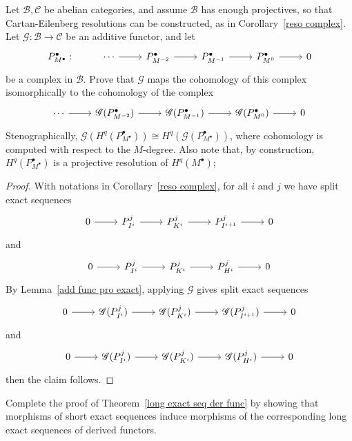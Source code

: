 \begin{exercise}\label{two fuc reso}
Let $\mathcal{B},\mathcal{C}$ be abelian categories, and assume $\mathcal{B}$ has enough projectives, so that Cartan-Eilenberg resolutions can be constructed, as in 
Corollary~\ref{reso complex}. Let $\mathscr{G}:\mathcal{B}\to\mathcal{C}$ be an additive functor, and let 
\[
\begin{tikzcd}
P^\bullet_{M^\bullet}:&\cdots\ar[r]&P^\bullet_{M^{-2}}\ar[r]&P^\bullet_{M^{-1}}\ar[r]&P^\bullet_{M^{0}}\ar[r]&0
\end{tikzcd}
\] be a complex in $\mathcal{B}$. Prove that $\mathscr{G}$ maps the cohomology of this complex isomorphically to the cohomology of the complex
\[\begin{tikzcd}
\cdots\ar[r]&\mathscr{G}(P^\bullet_{M^{-2}})\ar[r]&\mathscr{G}(P^\bullet_{M^{-1}})\ar[r]&\mathscr{G}(P^\bullet_{M^{0}})\ar[r]&0
\end{tikzcd}\]
Stenographically, $\mathscr{G}(H^q(P^\bullet_{M^\bullet}))\cong H^q(\mathscr{G}(P^\bullet_{M^\bullet}))$, where cohomology is computed
with respect to the $M$-degree. Also note that, by construction, $H^q(P^\bullet_{M^\bullet})$ is a projective resolution of $H^q(M^\bullet)$;
\end{exercise}
\begin{proof}
With notations in Corollary~\ref{reso complex}, for all $i$ and $j$ we have split exact sequences
\[\begin{tikzcd}
0\ar[r]&P^j_{I^i}\ar[r]&P^j_{K^i}\ar[r]&P^j_{I^{i+1}}\ar[r]&0
\end{tikzcd}\]
and
\[\begin{tikzcd}
0\ar[r]&P^j_{I^i}\ar[r]&P^j_{K^i}\ar[r]&P^j_{H^{i}}\ar[r]&0
\end{tikzcd}\]
By Lemma~\ref{add func pro exact}, applying $\mathscr{G}$ gives split exact sequences
\[\begin{tikzcd}
0\ar[r]&\mathscr{G}(P^j_{I^i})\ar[r]&\mathscr{G}(P^j_{K^i})\ar[r]&\mathscr{G}(P^j_{I^{i+1}})\ar[r]&0
\end{tikzcd}\]
and
\[\begin{tikzcd}
0\ar[r]&\mathscr{G}(P^j_{I^i})\ar[r]&\mathscr{G}(P^j_{K^i})\ar[r]&\mathscr{G}(P^j_{H^{i}})\ar[r]&0
\end{tikzcd}\]
then the claim follows.
\end{proof}
\begin{exercise}
Complete the proof of Theorem~\ref{long exact seq der func} by showing that morphisms of short exact sequences induce morphisms of the corresponding long exact sequences of derived functors.
\end{exercise}
